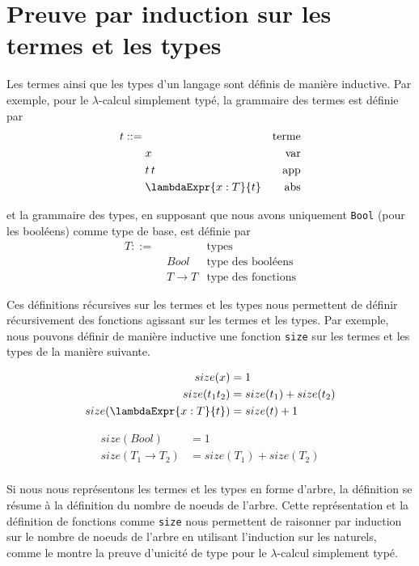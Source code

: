 \appendix
\chapter{Preuve par induction sur les termes et les types}

Les termes ainsi que les types d'un langage sont définis de manière inductive.
Par exemple, pour le $\lambda$-calcul simplement typé, la grammaire des termes
est définie par
\begin{align*}
  t ::= & \, & \text{terme} \\
        & \; x & \text{var} \\
        & \; t \, t & \text{app} \\
        & \; \lambdaExpr{x : T}{t} & \text{abs}
\end{align*}

et la grammaire des types, en supposant que nous avons uniquement \verb|Bool|
(pour les booléens) comme type de base, est définie par
\begin{align*}
  T ::= & \, & \text{types} \\
        & \; Bool & \text{type des booléens} \\
        & \; T \rightarrow T & \text{type des fonctions}
\end{align*}

Ces définitions récursives sur les termes et les types nous permettent de
définir récursivement des fonctions agissant sur les termes et les types. Par
exemple, nous pouvons définir de manière inductive une fonction
\verb|size| sur les termes et les types de la manière suivante.

\begin{align*}
  size(x) & = 1 \\
  size(t_{1} t_{2}) & = size(t_{1}) + size(t_{2}) \\
  size(\lambdaExpr{x : T}{t}) & = size(t) + 1
\end{align*}

\begin{align*}
  size(Bool) & = 1 \\
  size(T_{1} \rightarrow T_{2}) & = size(T_{1}) + size(T_{2}) \\
\end{align*}

Si nous nous représentons les termes et les types en forme d'arbre, la
définition se résume à la définition du nombre de noeuds de l'arbre. Cette
représentation et la définition de fonctions comme \verb|size| nous permettent de
raisonner par induction sur le nombre de noeuds de l'arbre en utilisant l'induction sur
les naturels, comme le montre la preuve d'unicité de type pour le
$\lambda$-calcul simplement typé.


